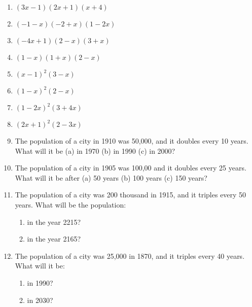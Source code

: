 \documentclass{report}
\begin{document}
\begin{enumerate}
	\item $(3x -1)(2x + 1)(x + 4)$
	\item $(-1 -x)(-2 + x)(1 - 2x)$
	\item $(-4x + 1)(2 - x)(3 + x)$
	\item $(1 -  x)(1 + x)(2 - x)$
	\item $(x - 1)^2(3 - x)$
	\item $(1 - x)^2(2-x)$
	\item $(1 - 2x)^2(3 + 4x)$
	\item $(2x + 1)^2(2 - 3x)$
	\item The population of a city in 1910 was 50,000, and it doubles every 10 years. What will it be (a) in 1970 (b) in 1990 (c) in 2000?
	\item The population of a city in 1905 was 100,00 and it doubles every 25 years. What will it be after (a) 50 years (b) 100 years (c) 150 years?
	\item The population of a city was 200 thousand in 1915, and it triples every 50 years. What will be the population:
		\begin{enumerate}
			\item in the year 2215?
			\item in the year 2165?
		\end{enumerate}
	\item The population of a city was 25,000 in 1870, and it triples every 40 years. What will it be:
		\begin{enumerate}
			\item in 1990?
			\item in 2030?
		\end{enumerate}
\end{enumerate}
\end{document}
